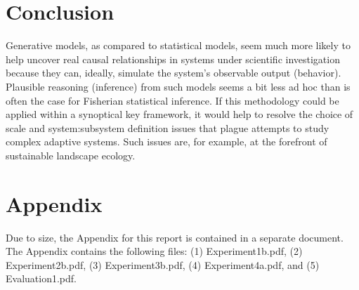 \documentclass[letter,11pt]{article}
\begin{document}
\section{Conclusion}
Generative models, as compared to statistical models, seem much more likely to help uncover real causal relationships in systems under scientific investigation because they can, ideally, simulate the system's observable output (behavior). Plausible reasoning (inference) from such models seems a bit less ad hoc than is often the case for Fisherian statistical inference. If this methodology could be applied within a synoptical key framework, it would help to resolve the choice of scale and system:subsystem definition issues that plague attempts to study complex adaptive systems. Such issues are, for example, at the forefront of sustainable landscape ecology.




\section{Appendix}
Due to size, the Appendix for this report is contained in a separate document. The Appendix contains the following files: (1) Experiment1b.pdf, (2) Experiment2b.pdf, (3) Experiment3b.pdf, (4) Experiment4a.pdf, and (5) Evaluation1.pdf.
\end{document}
